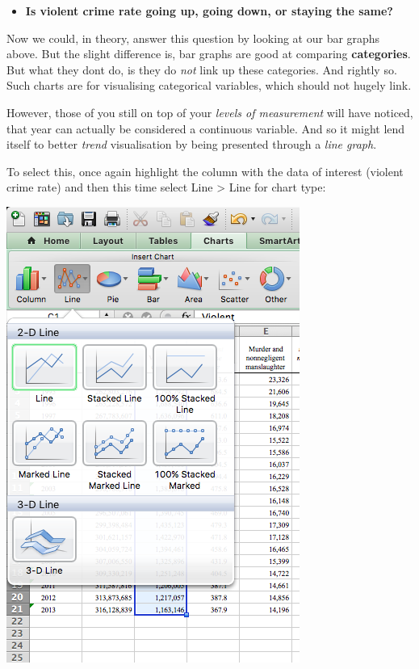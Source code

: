 \documentclass[]{book}
\providecommand{\tightlist}{%
  \setlength{\itemsep}{0pt}\setlength{\parskip}{0pt}}
\theoremstyle{definition}
\theoremstyle{definition}
\theoremstyle{definition}
\theoremstyle{remark}
\begin{document}
\begin{itemize}
\tightlist
\item
  \textbf{Is violent crime rate going up, going down, or staying the
  same?}
\end{itemize}

Now we could, in theory, answer this question by looking at our bar
graphs above. But the slight difference is, bar graphs are good at
comparing \textbf{categories}. But what they dont do, is they do
\emph{not} link up these categories. And rightly so. Such charts are for
visualising categorical variables, which should not hugely link.

However, those of you still on top of your \emph{levels of measurement}
will have noticed, that year can actually be considered a continuous
variable. And so it might lend itself to better \emph{trend}
visualisation by being presented through a \emph{line graph}.

 To select this, once again highlight the column with the data of
interest (violent crime rate) and then this time select Line
\textgreater{} Line for chart type:

\includegraphics{imgs/desc_line_1.png}
\end{document}
